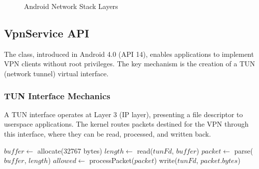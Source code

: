 \begin{figure}[htbp]
\centering
{}
\caption{Android Network Stack Layers}
\label{fig:android-network-stack}
\end{figure}

\subsection{VpnService API}

The  class, introduced in Android 4.0 (API 14), enables applications to implement VPN clients without root privileges. The key mechanism is the creation of a TUN (network tunnel) virtual interface.

\subsubsection{TUN Interface Mechanics}

A TUN interface operates at Layer 3 (IP layer), presenting a file descriptor to userspace applications. The kernel routes packets destined for the VPN through this interface, where they can be read, processed, and written back.

\begin{algorithm}[htbp]
\caption{VpnService Packet Processing Loop}
\label{alg:vpn-loop}
\begin{algorithmic}[1]
    \State $buffer \gets$ allocate(32767 bytes) 
        \State $length \gets$ read($tunFd$, $buffer$)
            \State $packet \gets$ parse($buffer$, $length$)
            \State $allowed \gets$ processPacket($packet$)
                \State write($tunFd$, $packet.bytes$)
            \EndIf
        \EndIf
    \EndWhile
\EndProcedure
\end{algorithmic}
\end{algorithm}

